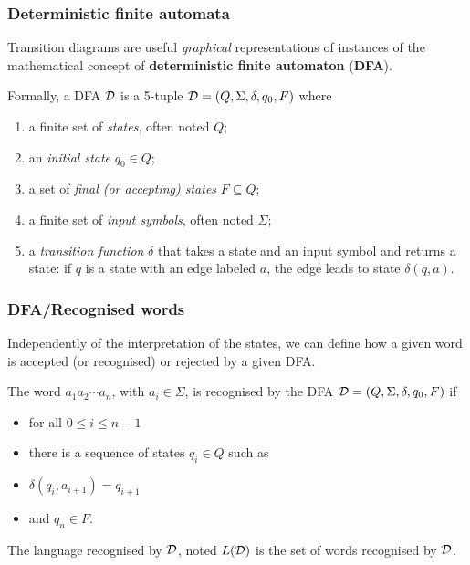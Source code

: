 
% 
\begin{frame}
\frametitle{Deterministic finite automata}
 
Transition diagrams are useful \emph{graphical} representations of
instances of the mathematical concept of \textbf{deterministic finite
automaton} (\textbf{DFA}).

\bigskip

Formally, a DFA \({\cal D}\) is a 5-tuple \({\cal D} = (Q, \Sigma,
\delta, q_0, F)\) where
\begin{enumerate}

  \item a finite set of \emph{states}, often noted \(Q\);

  \item an \emph{initial state} \(q_0 \in Q\);

  \item a set of \emph{final (\emph{or} accepting)
  states} \(F \subseteq Q\);

  \item a finite set of \emph{input symbols}, often noted \(\Sigma\);

  \item a \emph{transition function} \(\delta\) that takes 
  a state and an input symbol and returns a state: if \(q\) is a state
  with an edge labeled \(a\), the edge leads to state \(\delta(q,
  a)\).

\end{enumerate}

\end{frame}

% 
\begin{frame}
\frametitle{DFA/Recognised words}

Independently of the interpretation of the states, we can define how a
given word is accepted (or recognised) or rejected by a given DFA.

\bigskip

\noindent The word \(a_1 a_2 \cdots a_n\), with \(a_i \in \Sigma\), is
recognised by the DFA \({\cal D} = (Q, \Sigma, \delta, q_0, F)\) if
\begin{itemize}

  \item for all \(0 \leqslant i \leqslant n-1\)

  \item there is a sequence of states \(q_i \in Q\) such as 

  \item \(\delta (q_i, a_{i+1}) = q_{i+1}\) 

  \item and \(q_n \in F\).

\end{itemize}
The language recognised by \(\cal D\), noted \(L({\cal D})\) is the
set of words recognised by \(\cal D\).

\end{frame}

